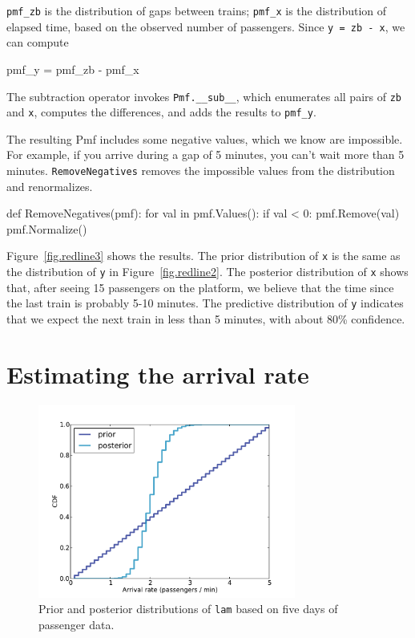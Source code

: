 \documentclass[12pt]{book}
\theoremstyle{exercise}
\begin{document}
\verb"pmf_zb" is the distribution of gaps between trains;
\verb"pmf_x" is the distribution of elapsed time, based on
the observed number of passengers.  Since {\tt y = zb - x},
we can compute

\begin{code}
    pmf_y = pmf_zb - pmf_x
\end{code}

The subtraction operator invokes \verb"Pmf.__sub__", which enumerates
all pairs of {\tt zb} and {\tt x}, computes the differences, and adds
the results to \verb"pmf_y".

The resulting Pmf includes some negative values, which we know are
impossible.  For example, if you arrive during a gap of 5 minutes, you
can't wait more than 5 minutes.  {\tt RemoveNegatives} removes the
impossible values from the distribution and renormalizes.

\begin{code}
def RemoveNegatives(pmf):
    for val in pmf.Values():
        if val < 0:
            pmf.Remove(val)
    pmf.Normalize()
\end{code}

Figure~\ref{fig.redline3} shows the results.  The prior distribution
of {\tt x} is the same as the distribution of {\tt y} in
Figure~\ref{fig.redline2}.  The posterior distribution of {\tt x}
shows that, after seeing 15 passengers on the platform, we believe
that the time since the last train is probably 5-10 minutes.  The
predictive distribution of {\tt y} indicates that we expect the next
train in less than 5 minutes, with about 80\% confidence.


\section{Estimating the arrival rate}

\begin{figure}
\centerline{\includegraphics[height=2.5in]{figs/redline1.pdf}}
\caption{Prior and posterior distributions of {\tt lam} based
on five days of passenger data. }
\label{fig.redline1}
\end{figure}
\end{document}
